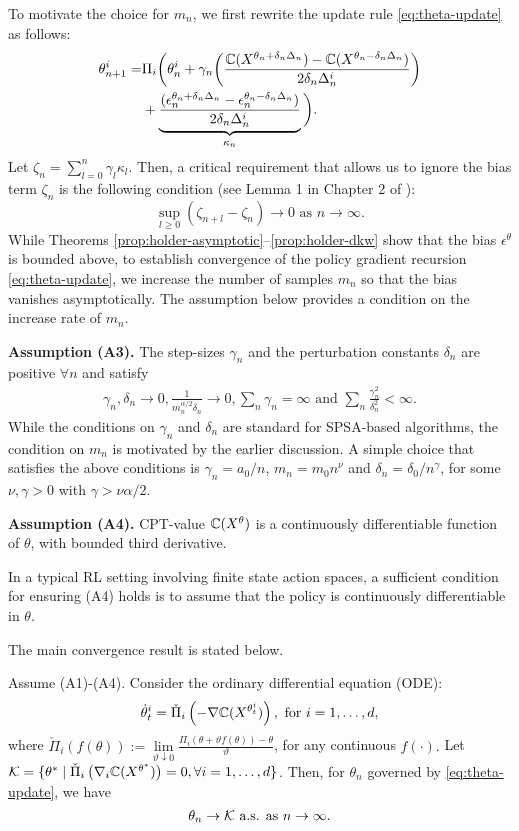 To motivate the choice for $m_n$, we first rewrite the update rule \eqref{eq:theta-update} as follows:
\begin{align*}
\theta^{i}_{n+1}  = & \Pi_{i}\bigg( \theta^{i}_n +  \gamma_n \bigg( \frac{\mathbb{C}(X^{\theta_n +\delta_n\Delta_n}) - \mathbb{C}(X^{\theta_n-\delta_n\Delta_n})}{2\delta_n\Delta_n^{i}}\bigg) \\
&+ \underbrace{\frac{(\epsilon_n^{\theta_n +\delta_n\Delta_n} - \epsilon_n^{\theta_n-\delta_n\Delta_n})}{2\delta_n\Delta_n^{i}}}_{\kappa_n}\bigg).
\end{align*}
Let $\zeta_n = \sum_{l = 0}^{n} \gamma_l \kappa_{l}$. Then, a critical requirement that allows us to ignore the bias term $\zeta_n$ is the following condition (see Lemma 1 in Chapter 2 of \cite{borkar2008stochastic}): 
$$\sup_{l\ge0} \left (\zeta_{n+l} - \zeta_n \right) \rightarrow 0 \text{ as } n\rightarrow\infty.$$ 
While Theorems \ref{prop:holder-asymptotic}--\ref{prop:holder-dkw} show that the bias $\epsilon^\theta$ is bounded above, to establish convergence of the policy gradient recursion \eqref{eq:theta-update}, we increase the number of samples $m_n$ so that the bias vanishes asymptotically.  The assumption below provides a condition on the increase rate of $m_n$.

\noindent\textbf{Assumption (A3).}  The step-sizes $\gamma_n$ and the perturbation constants 
$\delta_n$ are positive $\forall n$ and satisfy
\begin{align*}
\gamma_n, \delta_n \rightarrow 0, \frac{1}{m_n^{\alpha/2}\delta_n}\rightarrow 0,  \sum_n \gamma_n=\infty \text{ and } \sum_n \frac{\gamma_n^2}{\delta_n^2}<\infty. 
\end{align*}
While the conditions on $\gamma_n$ and $\delta_n$ are standard for SPSA-based algorithms, the condition on $m_n$ is motivated by the earlier discussion. 
A simple choice that satisfies the above conditions is $\gamma_n = a_0/n$, $m_n = m_0 n^\nu$ and $\delta_n = \delta_0/{n^\gamma}$, for some $\nu, \gamma >0$ with $\gamma > \nu\alpha/2$.

\noindent\textbf{Assumption (A4).}  CPT-value $\mathbb{C}(X^\theta)$ is a continuously differentiable function of $\theta$, with bounded third derivative.

In a typical RL setting involving finite state action spaces, a sufficient condition for ensuring (A4) holds is to assume that the policy is continuously differentiable in $\theta$. 

The main convergence result is stated below.
\begin{theorem}
\label{thm:1spsa-conv}
Assume (A1)-(A4).
Consider the  ordinary differential equation (ODE): 
$$\dot\theta^{i}_t = \check\Pi_{i}\left(- \nabla \mathbb{C}(X^{\theta^{i}_t})\right), \text{ for }i=1,\dots,d,$$ 
where 
$\check\Pi_{i}(f(\theta)) := \lim\limits_{\vartheta \downarrow 0} \frac{\Pi_{i}(\theta + \vartheta f(\theta)) - \theta}{\vartheta}$, for any continuous $f(\cdot).$
 Let $\mathcal{K} = \{\theta^* \mid \check\Pi_{i} \left(\nabla_i \mathbb{C}(X^{\theta^*})\right)=0, \forall i=1,\ldots,d\}$. Then, for $\theta_n$ governed by \eqref{eq:theta-update}, we have
$$\theta_n \rightarrow \mathcal{K} \text{ a.s. as } n\rightarrow \infty.$$
\end{theorem}

